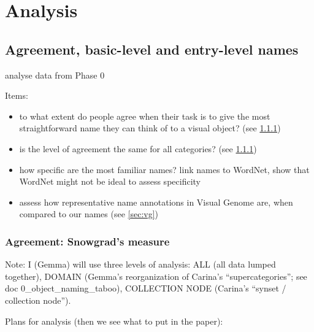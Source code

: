 
\section{Analysis}


\subsection{Agreement, basic-level and entry-level names}

analyse data from Phase 0

Items:

\begin{itemize}
\item  to what extent do people agree when their task is to give the most straightforward name they can think of to a visual object? (see \ref{sec:snowgrad})
\item is the level of agreement the same for all categories? (see \ref{sec:snowgrad})
\item how specific are the most familiar names? link names to WordNet, show that WordNet might not be ideal to assess specificity
\item assess how representative name annotations in Visual Genome are, when compared to our names (see \ref{sec:vg})
\end{itemize}

\subsubsection{Agreement: Snowgrad's measure}
\label{sec:snowgrad}

Note: I (Gemma) will use three levels of analysis: ALL (all data lumped together), DOMAIN (Gemma's reorganization of Carina's ``supercategories''; see doc 0\_object\_naming\_taboo), COLLECTION NODE (Carina's ``synset / collection node'').
 
Plans for analysis (then we see what to put in the paper):

